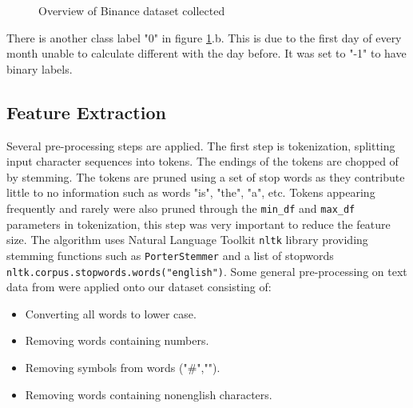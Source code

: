 \documentclass[transmag]{IEEEtran}
\begin{document}
\begin{figure}[h!]
    \centering
    \caption{Overview of Binance dataset collected}%
    \label{fig:binance_overview}%
\end{figure}

\noindent There is another class label "0" in figure \ref{fig:binance_overview}.b. This is due to the first day of every month unable to calculate different with the day before. It was set to "-1" to have binary labels.

\subsection{Feature Extraction}

\noindent Several pre-processing steps are applied. The first step is tokenization, splitting input character sequences into tokens. The endings of the tokens are chopped of by stemming. The tokens are pruned using a set of stop words as they contribute little to no information such as words "is", "the", "a", etc. Tokens appearing frequently and rarely were also pruned through the \verb|min_df| and \verb|max_df| parameters in tokenization, this step was very important to reduce the feature size. The algorithm uses Natural Language Toolkit \verb|nltk| library providing stemming functions such as \verb|PorterStemmer| and a list of stopwords \verb|nltk.corpus.stopwords.words("english")|. Some general pre-processing on text data from \cite{sattarov2020forecasting} were applied onto our dataset consisting of:
\begin{itemize}
  \item Converting all words to lower case.
  \item Removing words containing numbers.
  \item Removing symbols from words ("\#","\@@").
  \item Removing words containing non\-english characters.
\end{itemize}
\end{document}
